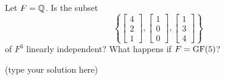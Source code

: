 \begin{ProbBox} %
\begin{problem}[Golan 163]
Let $F = \mathbb{Q}$.  Is the subset
\[
\left\{ 
\begin{bmatrix}
  4\\[0.3em] 2\\[0.3em] 1
\end{bmatrix},
\begin{bmatrix}
  1\\[0.3em] 0\\[0.3em] 0
\end{bmatrix},
\begin{bmatrix}
  1\\[0.3em] 3\\[0.3em] 4
\end{bmatrix}
\right\}
\]
of $F^3$ linearly independent?  What happens if $F = \operatorname{GF}(5)$?
\end{problem}
\smallskip
\begin{solution}
(type your solution here)
\end{solution}
\end{ProbBox}
\probskip



